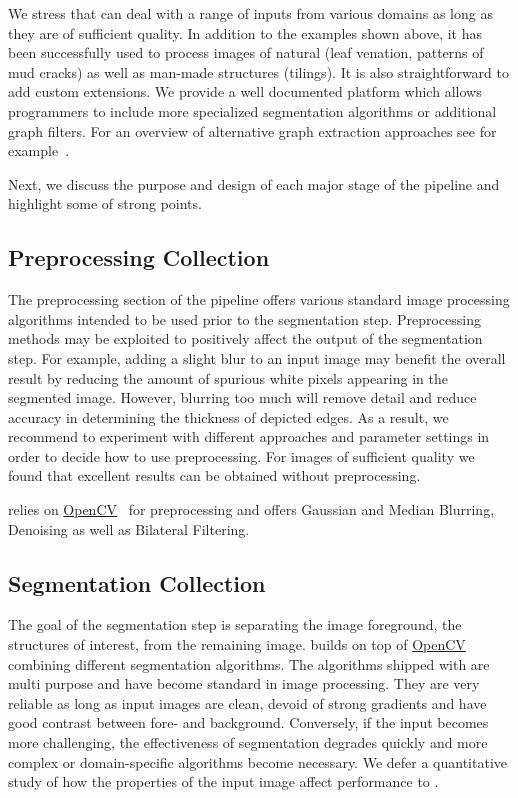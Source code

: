 	We stress that \NEFI can deal with a range of inputs from various domains as long as they are of sufficient quality. In addition to the examples shown above, it has been successfully used to process images of natural (\eg leaf venation, patterns of mud cracks) as well as man-made structures (\eg tilings). It is also straightforward to add custom extensions. We provide a well documented platform which allows programmers to include more specialized segmentation algorithms or additional graph filters. For an overview of alternative graph extraction approaches see for example~\cite{dehkordi2011review}.

	Next, we discuss the purpose and design of each major stage of the pipeline and highlight some of \NEFIs strong points.


	\subsection{Preprocessing Collection}

		The preprocessing section of the pipeline offers various standard image processing algorithms intended to be used prior to the segmentation step. Preprocessing methods may be exploited to positively affect the output of the segmentation step. For example, adding a slight blur to an input image may benefit the overall result by reducing the amount of spurious white pixels appearing in the segmented image. However, blurring too much will remove detail and reduce accuracy in determining the thickness of depicted edges. As a result, we recommend to experiment with different approaches and parameter settings in order to decide how to use preprocessing. For images of sufficient quality we found that excellent results can be obtained without preprocessing. 

		\NEFI relies on \href{http://opencv.org/}{OpenCV}~\cite{opencv} for preprocessing and offers Gaussian and Median Blurring, Denoising as well as Bilateral Filtering.

	\subsection{Segmentation Collection}

		The goal of the segmentation step is separating the image foreground, \ie the structures of interest, from the remaining image. \NEFI builds on top of \href{http://opencv.org/}{OpenCV}~\cite{opencv} combining different segmentation algorithms. The algorithms shipped with \NEFI are multi purpose and have become standard in image processing. They are very reliable as long as input images are clean, devoid of strong gradients and have good contrast between fore- and background. Conversely, if the input becomes more challenging, the effectiveness of \NEFIs segmentation degrades quickly and more complex or domain-specific algorithms become necessary. We defer a quantitative study of how the properties of the input image affect \NEFIs performance to . 

